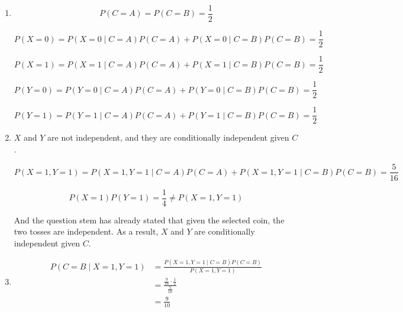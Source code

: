 \documentclass[a4paper]{article}
\begin{document}
\begin{enumerate}
    \item[(a)]
    
    $$
    P(C=A) = P(C=B) = \frac{1}{2}
    $$

    $$
    P(X=0) = P(X=0 \mid C=A)P(C=A) + P(X=0 \mid C=B)P(C=B) = \frac{1}{2}
    $$
    
    $$
    P(X=1) = P(X=1 \mid C=A)P(C=A) + P(X=1 \mid C=B)P(C=B) = \frac{1}{2}
    $$

    $$
    P(Y=0) = P(Y=0 \mid C=A)P(C=A) + P(Y=0 \mid C=B)P(C=B) = \frac{1}{2}
    $$

    $$
    P(Y=1) = P(Y=1 \mid C=A)P(C=A) + P(Y=1 \mid C=B)P(C=B) = \frac{1}{2}
    $$

    \item[(b)]
    
    $X$ and $Y$ are not independent, and they are conditionally independent given $C$.

    $$
    P(X=1, Y=1) = P(X=1, Y=1 \mid C=A)P(C=A) + P(X=1, Y=1 \mid C=B)P(C=B) = \frac{5}{16}
    $$

    $$
    P(X=1)P(Y=1) = \frac{1}{4} \neq P(X=1, Y=1)
    $$

    And the question stem has already stated that given the selected coin, the two tosses are independent. As a result, $X$ and $Y$ are conditionally independent given $C$.

    \item[(c)]
    
    $$
    \begin{aligned}
    P(C=B \mid X=1, Y=1)
    &= \frac{P(X=1, Y=1 \mid C=B)P(C=B)}{P(X=1, Y=1)} \\
    &= \frac{\frac{9}{16} \cdot \frac{1}{2}}{\frac{5}{16}} \\
    &= \frac{9}{10}
    \end{aligned}
    $$
\end{enumerate}

\newpage
\end{document}
